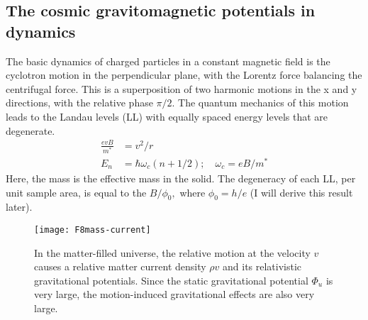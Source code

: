 \documentclass[aps,preprint,12pt,tightenlines]{revtex4}%
\begin{document}
\subsection{The cosmic gravitomagnetic potentials in dynamics}

The basic dynamics of charged particles in a constant magnetic field is the
cyclotron motion in the perpendicular plane, with the Lorentz force balancing
the centrifugal force. This is a superposition of two harmonic motions in the
x and y directions, with the relative phase $\pi/2$. The quantum mechanics of
this motion leads to the Landau levels (LL) with equally spaced energy levels that
are degenerate.
\begin{align}
\frac{evB}{m^{\ast}}  &  =v^{2}/r\\
E_{n}  &  =\hbar\omega_{c}(n+1/2);\quad\omega_{c}=eB/m^{\ast}%
\end{align}
Here, the mass is the effective mass in the solid. The degeneracy of each
LL, per unit sample area, is equal to the $B/\phi_{0},$ where
$\phi_{0}=h/e$ (I will derive this result later).

\begin{figure}
	\centering
	\texttt{[image: F8mass-current]}
	\caption{In the matter-filled universe, the relative motion at the velocity
		$v$ causes a relative matter current density $\rho v$ and its relativistic
		gravitational potentials. Since the static gravitational potential $\Phi_{u}$
		is very large, the motion-induced gravitational effects are also very large.}
	\label{fig:mass-current}
\end{figure}
\end{document}
